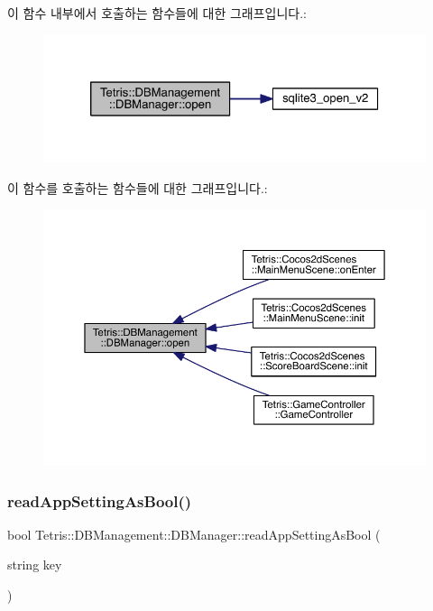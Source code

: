 이 함수 내부에서 호출하는 함수들에 대한 그래프입니다.\+:
\nopagebreak
\begin{figure}[H]
\begin{center}
\leavevmode
\includegraphics[width=324pt]{class_tetris_1_1_d_b_management_1_1_d_b_manager_a8bf7e756a9cca7e57fef00076fb62f36_cgraph}
\end{center}
\end{figure}
이 함수를 호출하는 함수들에 대한 그래프입니다.\+:
\nopagebreak
\begin{figure}[H]
\begin{center}
\leavevmode
\includegraphics[width=350pt]{class_tetris_1_1_d_b_management_1_1_d_b_manager_a8bf7e756a9cca7e57fef00076fb62f36_icgraph}
\end{center}
\end{figure}
\mbox{\label{class_tetris_1_1_d_b_management_1_1_d_b_manager_a598b8014fcad434b5b1162cc6767d22c}} 
\subsubsection{\texorpdfstring{read\+App\+Setting\+As\+Bool()}{readAppSettingAsBool()}}
{\footnotesize\ttfamily bool Tetris\+::\+D\+B\+Management\+::\+D\+B\+Manager\+::read\+App\+Setting\+As\+Bool (\begin{DoxyParamCaption}\item[{string}]{key }\end{DoxyParamCaption})\hspace{0.3cm}{\ttfamily [inline]}}

